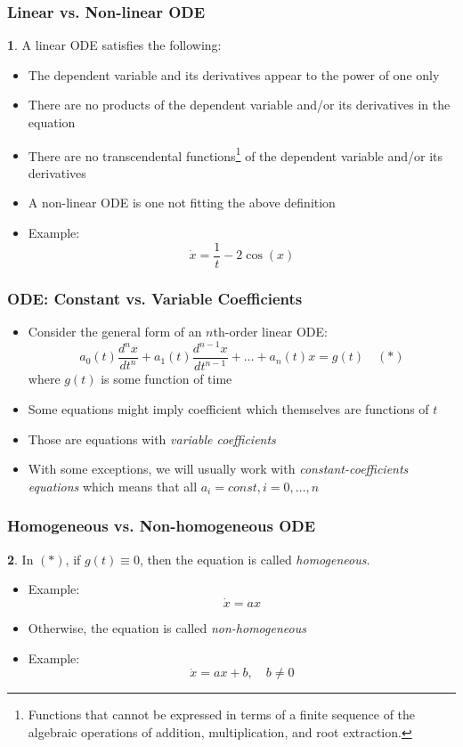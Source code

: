 \documentclass[10pt,usenames,dvipsnames]{beamer}
\theoremstyle{definition}
\newtheorem{definition}{\translate{Definition}}
\begin{document}
\begin{frame}[fragile]
\frametitle{Linear vs. Non-linear ODE}
\begin{definition}
	A linear ODE satisfies the following:
	\begin{itemize}
	 	\item The dependent variable and its derivatives appear to the power of one only
	 	\item There are no products of the dependent variable and/or its derivatives in the equation
	 	\item There are no transcendental functions\footnote{Functions that cannot be expressed in terms of a finite sequence of the algebraic operations of addition, multiplication, and root extraction.} of the dependent variable and/or its derivatives
	 \end{itemize} 
\end{definition}
\begin{itemize}
	\item A non-linear ODE is one not fitting the above definition
	\item Example:
	\[
		\dot{x} = \dfrac{1}{t} -2\cos(x)
	\]
\end{itemize}
\end{frame}

\begin{frame}[fragile]
\frametitle{ODE: Constant vs. Variable Coefficients}
\begin{itemize}
	\item Consider the general form of an $n$th-order linear ODE:
	\[
		a_{0}(t)\dfrac{d^{n}x}{dt^{n}} + a_{1}(t)\dfrac{d^{n-1}x}{dt^{n-1}} + \ldots + a_{n}(t)x = g(t) \quad (*)
	\]
	where $g(t)$ is some function of time
	\item Some equations might imply coefficient which themselves are functions of $t$ 
	\item Those are equations with \textit{variable coefficients} 
	\item With some exceptions, we will usually work with \textit{constant-coefficients equations} which means that all $a_{i} = const,i = 0,\ldots,n$
\end{itemize}
\end{frame}

\begin{frame}[fragile]
\frametitle{Homogeneous vs. Non-homogeneous ODE}
\begin{definition}
	In $(*)$, if $g(t) \equiv 0$, then the equation is called \textit{homogeneous}.
\end{definition}
\begin{itemize}
	\item Example:
	\[
		\dot{x} = ax
	\]
	\item Otherwise, the equation is called \textit{non-homogeneous}
		\item Example:
	\[
		\dot{x} = ax + b, \quad b \neq 0
	\]
\end{itemize}
\end{frame}
\end{document}
